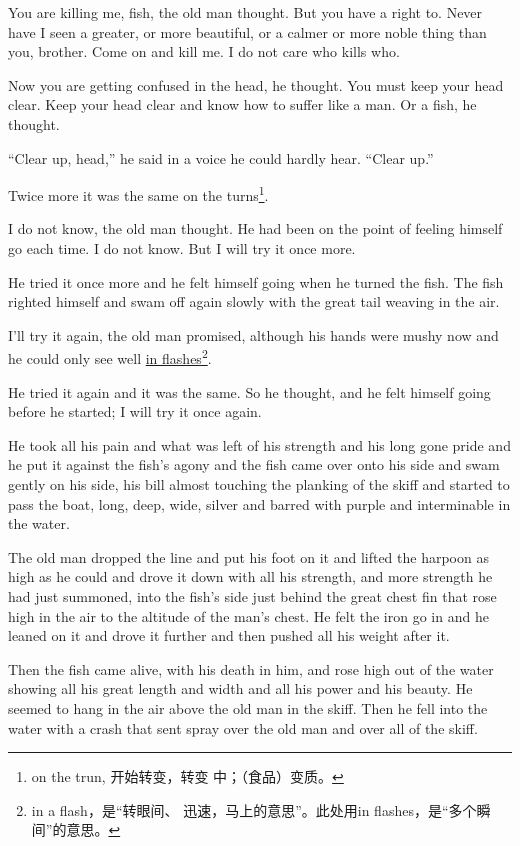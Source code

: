 \documentclass[fontset=ubuntu]{ctexrep}
\newlength{\drop}%
\begin{document}
You are killing me, fish, the old man thought. But you have a right to.
Never have I seen a greater, or more beautiful, or a calmer or more noble
thing than you, brother. Come on and kill me. I do not care who kills who.

Now you are getting \gls{confused} in the head, he thought. You must keep your
head clear. Keep your head clear and know how to \gls{suffer} like a man. Or a
fish, he thought.

``Clear up, head,'' he said in a voice he could hardly hear. ``Clear up.''

Twice more it was the same on the turns\footnote{on the trun, 开始转变，转变
  中；（食品）变质。}.

I do not know, the old man thought. He had been on the point of feeling
himself go each time. I do not know. But I will try it once more.

He tried it once more and he felt himself going when he turned the fish. The
fish righted himself and swam off again slowly with the great tail weaving
in the air.

I'll try it again, the old man promised, although his hands were \gls{mushy}
now and he could only see well \uline{in flashes}\footnote{in a flash，是“转眼间、
  迅速，马上的意思”。此处用in flashes，是“多个瞬间”的意思。}.

He tried it again and it was the same. So he thought, and he felt himself
going before he started; I will try it once again.

He took all his pain and what was left of his strength and his long gone
pride and he put it against the fish's \gls{agony} and the fish came over
onto his side and swam gently on his side, his bill almost touching the
planking of the skiff and started to pass the boat, long, deep, wide, silver
and \gls{barred} with purple and \gls{interminable} in the water.

The old man dropped the line and put his foot on it and lifted the harpoon
as high as he could and drove it down with all his strength, and more
strength he had just \gls{summoned}, into the fish's side just behind the
great \gls{chest} fin that rose high in the air to the \gls{altitude} of the
man's chest. He felt the \gls{iron} go in and he leaned on it and drove it
further and then pushed all his weight after it.

Then the fish came alive, with his death in him, and rose high out of the
water showing all his great length and width and all his power and his
beauty. He seemed to \gls{hang} in the air above the old man in the skiff.
Then he fell into the water with a crash that sent \gls{spray} over the old
man and over all of the skiff.
\end{document}
